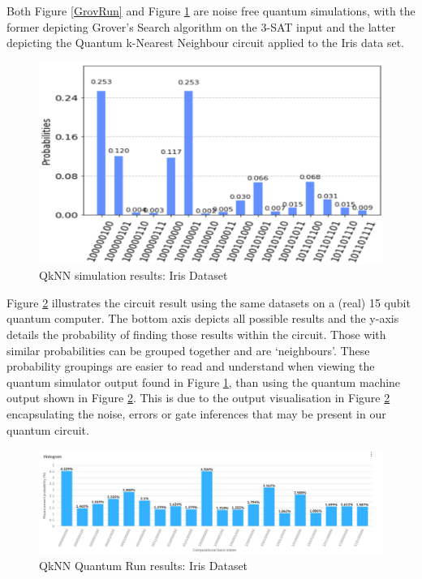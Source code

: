 Both Figure \ref{GrovRun} and Figure \ref{irisSim} are noise free quantum simulations, with the former depicting Grover's Search algorithm on the 3-SAT input and the latter depicting the Quantum k-Nearest Neighbour circuit applied to the Iris data set.

\begin{figure}[H]
      \centering
      \includegraphics[scale=0.7]{background/IrisSimi.png}
      \caption{QkNN simulation results: Iris Dataset}
      \label{irisSim}
\end{figure}


Figure \ref{IrisQuan} illustrates the circuit result using the same datasets on a (real) 15 qubit quantum computer. The bottom axis depicts all possible results and the y-axis details the probability of finding those results within the circuit. Those with similar probabilities can be grouped together and are ‘neighbours’. These probability groupings are easier to read and understand when viewing the quantum simulator output found in Figure \ref{irisSim}, than using the quantum machine output shown in Figure \ref{IrisQuan}. This is due to the output visualisation in Figure \ref{IrisQuan} encapsulating the noise, errors or gate inferences that may be present in our quantum circuit.


\begin{figure}[H]
      \centering
      \includegraphics[scale=0.7]{background/irisQ.png}
      \caption{QkNN Quantum Run results: Iris Dataset}
      \label{IrisQuan}
\end{figure}


